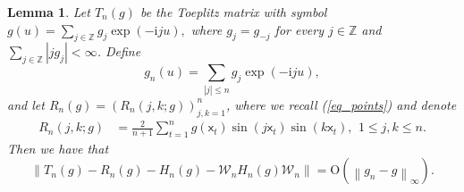 \documentclass[10pt,a4paper]{amsart}
\newtheorem{lemma}{Lemma}
\newcommand{\sfx}{\mathsf{x}}
\begin{document}
\begin{lemma}\label{lem_aux_toeplitz}
Let \(T_n(g)\) be the Toeplitz matrix with symbol $g(u)=\sum_{j\in\mathbb{Z}}g_j\exp(-\mathrm{i}ju),$
where \(g_j=g_{-j}\) for every \(j\in\mathbb{Z}\) and $\sum_{j\in\mathbb{Z}}|jg_j|<\infty$. Define
\begin{equation*}
g_n(u)=\sum_{|j|\leq n}g_j\exp(-\mathrm{i}ju),
\end{equation*}
and let \(R_n(g)=(R_n(j,k;g))_{j,k=1}^n\), where we recall (\ref{eq_points}) and denote
\begin{align*}
R_n(j,k;g)
&=
\frac{2}{n+1}
\sum_{t=1}^{n}
g(\sfx_t)\sin(j\sfx_t)\sin(k\sfx_t), \ \,
1\leq j,k\leq n. 
\end{align*}
Then we have that 
\begin{equation*}
\left\|
T_n(g)-R_n(g)-H_n(g)-\mathcal{W}_nH_n(g)\mathcal{W}_n
\right\|
=
\mathrm{O}\!\left(\left\|g_n-g\right\|_\infty\right).
\end{equation*}
\end{lemma}
\end{document}
